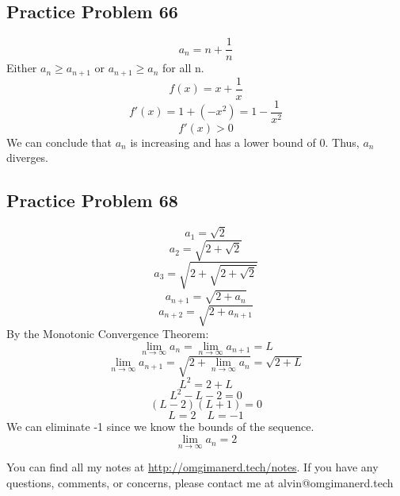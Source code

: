 \documentclass{math}
\begin{document}
\subsection*{Practice Problem 66}
\[ a_{n} = n+\frac{1}{n} \]
Either \( a_{n} \geq a_{n+1} \) or \( a_{n+1} \geq a_{n} \) for all n.
\[ f(x) = x+\frac{1}{x} \]
\[ f'(x) = 1+(-x^{2}) = 1-\frac{1}{x^{2}} \]
\[ f'(x) > 0 \]
We can conclude that \( a_{n} \) is increasing and has a lower bound of 0.
Thus, \( a_{n} \) diverges.

\subsection*{Practice Problem 68}
\[ a_{1} = \sqrt{2} \]
\[ a_{2} = \sqrt{2+\sqrt{2}} \]
\[ a_{3} = \sqrt{2+\sqrt{2+\sqrt{2}}} \]
\[ a_{n+1} = \sqrt{2+a_{n}} \]
\[ a_{n+2} = \sqrt{2+a_{n+1}} \]
By the Monotonic Convergence Theorem:
\[ \lim_{n\to\infty}{a_{n}} = \lim_{n\to\infty}{a_{n+1}} = L \]
\[ \lim_{n\to\infty}{a_{n+1}} = \sqrt{2+\lim_{n\to\infty}{a_{n}}} =
   \sqrt{2+L} \]
\[ L^{2} = 2+L \]
\[ L^{2}-L-2 = 0 \]
\[ (L-2)(L+1) = 0 \]
\[ L = 2 \quad L = -1 \]
We can eliminate -1 since we know the bounds of the sequence.
\[ \lim_{n\to\infty}{a_{n}} = 2 \]

\begin{center}
  You can find all my notes at \url{http://omgimanerd.tech/notes}. If you have
  any questions, comments, or concerns, please contact me at
  alvin@omgimanerd.tech
\end{center}
\end{document}
